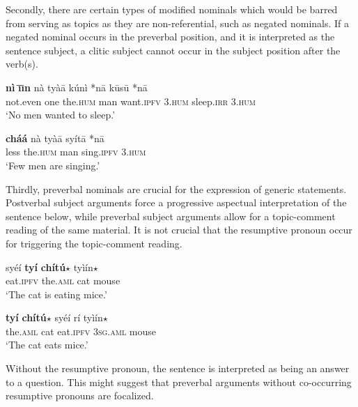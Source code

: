 \documentclass[output=paper,modfonts,nonflat]{langsci/langscibook}
\begin{document}
Secondly, there are certain types of modified nominals which would be barred from serving as topics as they are non-referential, such as negated nominals.  If a negated nominal occurs in the preverbal position, and it is interpreted as the sentence subject, a clitic subject cannot occur in the subject position after the verb(s).

\ea {}\label{ex:cosneros:24}
\gll
{\ob}\textbf{n\`i} \textbf{\=\i\=\i n} n\`a ty\`a\=a{\cb} k\'un\`i {\op}\textnormal{*}n\=a{\cp} k\=us\=u {\op}\textnormal{*}n\=a{\cp}\\
{\db}not.even one the.\textsc{hum} man want.\textsc{ipfv} \phantom{(*}3.\textsc{hum} sleep.\textsc{irr} \phantom{(*}3.\textsc{hum}\\
\glt
`No men wanted to sleep.'
\z 

\ea {}\label{ex:cisneros:25}
\gll
{\ob}\textbf{ch\'a\'a} n\`a ty\`a\=a{\cb} sy\'it\=a {\op}\textnormal{*}n\=a{\cp}\\
{\db}less the.\textsc{hum} man sing.\textsc{ipfv} \phantom{(*}3.\textsc{hum}\\
\glt
`Few men are singing.'
\z 

Thirdly, preverbal nominals are crucial for the expression of generic statements.  Postverbal subject arguments force a progressive aspectual interpretation of the sentence below, while preverbal subject arguments allow for a topic-comment reading of the same material.  It is not crucial that the resumptive pronoun occur for triggering the topic-comment reading.

\ea {}\label{ex:cisneros:26}
\ea
\gll
sy\'e\'i {\ob}\textbf{ty\'i} \textbf{ch\'it\'u$\star$}{\cb} ty\`i\'in$\star$\\
eat.\textsc{ipfv} \phantom{[}the.\textsc{aml} cat mouse\\
\glt `The cat is eating mice.'

\ex
\gll
{\ob}\textbf{ty\'i} \textbf{ch\'it\'u$\star$}{\cb} sy\'e\'i {\op}r\'i{\cp} ty\`i\'in$\star$\\
{\db}the.\textsc{aml} cat eat.\textsc{ipfv} {\phantom{(}}3\textsc{sg.aml} mouse\\
\glt `The cat eats mice.'
\z 
\z

Without the resumptive pronoun, the sentence is interpreted as being an answer to a question.  This might suggest that preverbal arguments without co-occurring resumptive pronouns are focalized.
\end{document}
